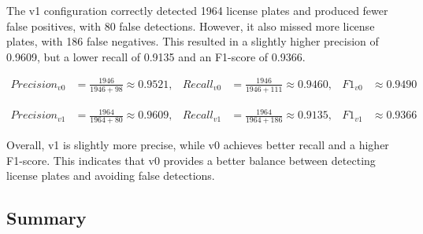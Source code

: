 The v1 configuration correctly detected 1964 license plates and produced fewer
false positives, with 80 false detections. However, it also missed more license
plates, with 186 false negatives. This resulted in a slightly higher precision
of 0.9609, but a lower recall of 0.9135 and an F1-score of 0.9366.

\begin{align*}
Precision_{v0} &= \frac{1946}{1946 + 98} \approx 0.9521,
&
Recall_{v0} &= \frac{1946}{1946 + 111} \approx 0.9460,
&
F1_{v0} &\approx 0.9490
\end{align*}

\begin{align*}
Precision_{v1} &= \frac{1964}{1964 + 80} \approx 0.9609,
&
Recall_{v1} &= \frac{1964}{1964 + 186} \approx 0.9135,
&
F1_{v1} &\approx 0.9366
\end{align*}

Overall, v1 is slightly more precise, while v0 achieves better recall and a
higher F1-score. This indicates that v0 provides a better balance between
detecting license plates and avoiding false detections.

\subsection{Summary}